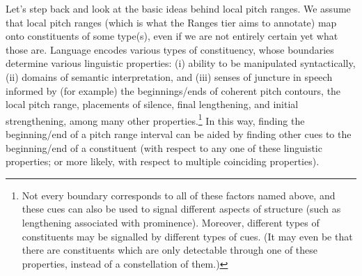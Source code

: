 \documentclass[11pt, twoside]{memoir}
\begin{document}
Let’s step back and look at the basic ideas behind local pitch ranges. We assume that local pitch ranges (which is what the Ranges tier aims to annotate) map onto constituents of some type(s), even if we are not entirely certain yet what those are. Language encodes various types of constituency, whose boundaries determine various linguistic properties: (i) ability to be manipulated syntactically, (ii) domains of semantic interpretation, and (iii) senses of juncture in speech informed by (for example) the beginnings\slash ends of coherent pitch contours, the local pitch range, placements of silence, final lengthening, and initial strengthening, among many other properties.\footnote{Not every boundary corresponds to all of these factors named above, and these cues can also be used to signal different aspects of structure (such as lengthening associated with prominence). Moreover, different types of constituents may be signalled by different types of cues. (It may even be that there are constituents which are only detectable through one of these properties, instead of a constellation of them.)} In this way, finding the beginning\slash end of a pitch range interval can be aided by finding other cues to the beginning\slash end of a constituent (with respect to any one of these linguistic properties; or more likely, with respect to multiple coinciding properties).
\end{document}
